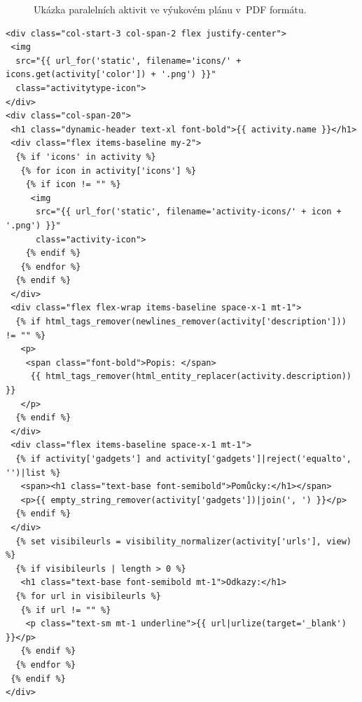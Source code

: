 \documentclass[male,czech,api_bc]{kitheses}
\begin{document}
\begin{figure}[H]
	\centering
	\caption{Ukázka paralelních aktivit ve výukovém plánu v~PDF formátu.}
	\label{fig:edubo-3}
\end{figure}

\begin{lstlisting}
<div class="col-start-3 col-span-2 flex justify-center">
 <img
  src="{{ url_for('static', filename='icons/' + icons.get(activity['color']) + '.png') }}"
  class="activitytype-icon">
</div>
<div class="col-span-20">
 <h1 class="dynamic-header text-xl font-bold">{{ activity.name }}</h1>
 <div class="flex items-baseline my-2">
  {% if 'icons' in activity %}
   {% for icon in activity['icons'] %}
    {% if icon != "" %}
     <img
      src="{{ url_for('static', filename='activity-icons/' + icon + '.png') }}"
      class="activity-icon">
    {% endif %}
   {% endfor %}
  {% endif %}
 </div>
 <div class="flex flex-wrap items-baseline space-x-1 mt-1">
  {% if html_tags_remover(newlines_remover(activity['description'])) != "" %}
   <p>
    <span class="font-bold">Popis: </span>
     {{ html_tags_remover(html_entity_replacer(activity.description)) }}
   </p>
  {% endif %}
 </div>
 <div class="flex items-baseline space-x-1 mt-1">
  {% if activity['gadgets'] and activity['gadgets']|reject('equalto', '')|list %}
   <span><h1 class="text-base font-semibold">Pomůcky:</h1></span>
   <p>{{ empty_string_remover(activity['gadgets'])|join(', ') }}</p>
  {% endif %}
 </div>
  {% set visibileurls = visibility_normalizer(activity['urls'], view) %}
  {% if visibileurls | length > 0 %}
   <h1 class="text-base font-semibold mt-1">Odkazy:</h1>
  {% for url in visibileurls %}
   {% if url != "" %}
    <p class="text-sm mt-1 underline">{{ url|urlize(target='_blank') }}</p>
   {% endif %}
  {% endfor %}
 {% endif %}
</div>
\end{lstlisting}
\end{document}
